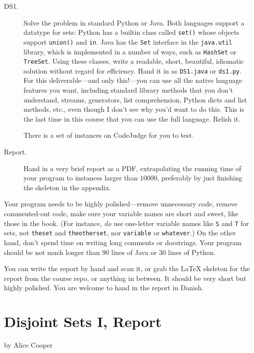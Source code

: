 \documentclass{tufte-handout}
\begin{document}
\begin{description}
  \item[DS1.]
    Solve the problem in standard Python or Java.
    Both languages support a datatype for sets:
    Python has a builtin class called \texttt{set()} whose objects support \texttt{union()} and \texttt{in}.
    Java has the \texttt{Set} interface in the \texttt{java.util} library, which is implemented in a number of ways, such as \texttt{HashSet} or \texttt{TreeSet}.
    Using these classes, write a readable, short, beautiful, idiomatic solution without regard for efficiency.
    Hand it in as \texttt{DS1.java} or \texttt{ds1.py}.
    For this deliverable---and only this!---you can use all the native language features you want, including standard library methods that you don't understand, streams, generators, list comprehension, Python dicts and list methods, etc., even though I don't see why you'd want to do this.
    This is the last time in this course that you can use the full language.
    Relish it.
    
    There is a set of instances on CodeJudge for you to test.
  \item[Report.]
    Hand in a very brief report as a PDF, extrapolating the running time of your program to instances larger than $10000$, preferably by just finishing the skeleton in the appendix. 
\end{description}

Your program needs to be highly polished---remove unnecessary code, remove commented-out code, make sure your variable names are short and sweet, like those in the book.
(For instance, \emph{do} use one-letter variable names like \texttt{S} and \texttt{T} for sets, not \texttt{theset} and \texttt{theotherset}, nor \texttt{variable} or \texttt{whatever}.)
On the other hand, don't spend time on writing long comments or docstrings.
Your program should be not much longer than 90 lines of Java or 30 lines of Python.

You can write the report by hand and scan it, or grab the LaTeX skeleton for the report from the course repo, or anything in between.
It should be very short but highly polished.
You are welcome to hand in the report in Danish.

\newpage
\section{Disjoint Sets I, Report}

by Alice Cooper
\end{document}
